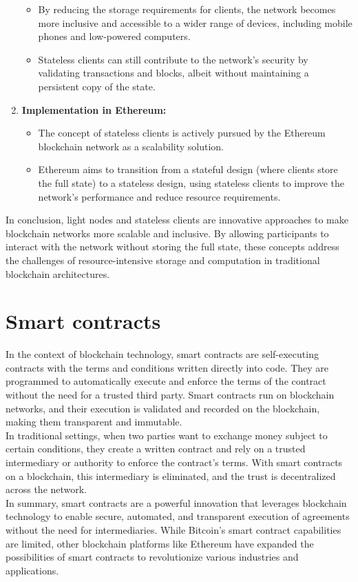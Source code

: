 \begin{enumerate}
\begin{itemize}
        \item By reducing the storage requirements for clients, the network becomes more inclusive and accessible to a wider range of devices, including mobile phones and low-powered computers.
        \item Stateless clients can still contribute to the network's security by validating transactions and blocks, albeit without maintaining a persistent copy of the state.
    \end{itemize}
    \item \textbf{Implementation in Ethereum:}
    \begin{itemize}
        \item The concept of stateless clients is actively pursued by the Ethereum blockchain network as a scalability solution.
        \item Ethereum aims to transition from a stateful design (where clients store the full state) to a stateless design, using stateless clients to improve the network's performance and reduce resource requirements.
    \end{itemize}
\end{enumerate}
In conclusion, light nodes and stateless clients are innovative approaches to make blockchain networks more scalable and inclusive. By allowing participants to interact with the network without storing the full state, these concepts address the challenges of resource-intensive storage and computation in traditional blockchain architectures.

\section{Smart contracts}
In the context of blockchain technology, smart contracts are self-executing contracts with the terms and conditions written directly into code. They are programmed to automatically execute and enforce the terms of the contract without the need for a trusted third party. Smart contracts run on blockchain networks, and their execution is validated and recorded on the blockchain, making them transparent and immutable.\\
In traditional settings, when two parties want to exchange money subject to certain conditions, they create a written contract and rely on a trusted intermediary or authority to enforce the contract's terms. With smart contracts on a blockchain, this intermediary is eliminated, and the trust is decentralized across the network.\\
In summary, smart contracts are a powerful innovation that leverages blockchain technology to enable secure, automated, and transparent execution of agreements without the need for intermediaries. While Bitcoin's smart contract capabilities are limited, other blockchain platforms like Ethereum have expanded the possibilities of smart contracts to revolutionize various industries and applications.

